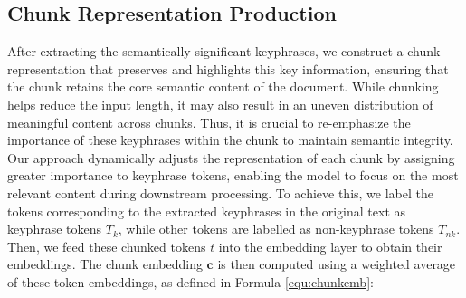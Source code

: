 \documentclass[11pt]{article}
\begin{document}


\subsection{Chunk Representation Production}
After extracting the semantically significant keyphrases, we construct a chunk representation that preserves and highlights this key information, ensuring that the chunk retains the core semantic content of the document. While chunking helps reduce the input length, it may also result in an uneven distribution of meaningful content across chunks. Thus, it is crucial to re-emphasize the importance of these keyphrases within the chunk to maintain semantic integrity. Our approach dynamically adjusts the representation of each chunk by assigning greater importance to keyphrase tokens, enabling the model to focus on the most relevant content during downstream processing.
To achieve this, we label the tokens corresponding to the extracted keyphrases in the original text as keyphrase tokens $T_k$, while other tokens are labelled as non-keyphrase tokens $T_{nk}$. Then, we feed these chunked tokens $t$ into the embedding layer to obtain their embeddings. The chunk embedding $\boldsymbol{c}$ is then computed using a weighted average of these token embeddings, as defined in Formula \ref{equ:chunkemb}:

\end{document}
